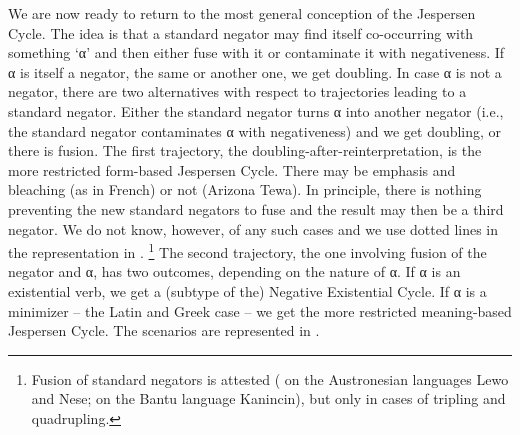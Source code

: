 ﻿\documentclass[output=paper,draft,draftmode,colorlinks,citecolor=brown]{langscibook}
\begin{document}
We are now ready to return to the most general conception of the Jespersen
Cycle. The idea is that a standard negator may find itself co-occurring
with something `α' and then either fuse with it or contaminate it with
negativeness. If α is itself a negator, the same or another one, we get
doubling. In case α is not a negator, there are two alternatives with
respect to trajectories leading to a standard negator. Either the standard
negator turns α into another negator (i.e., the standard negator
contaminates α with negativeness) and we get doubling, or there is fusion.
The first trajectory, the doubling-after-reinterpretation, is the more
restricted form-based Jespersen Cycle. There may be emphasis and bleaching
(as in French) or not (Arizona Tewa). In principle, there is nothing
preventing the new standard negators to fuse and the result may then be a
third negator. We do not know, however, of any such cases and we use dotted
lines in the representation in .%
%
\footnote{Fusion of standard
negators is attested (\citealt[18]{Vossen2016} on the Austronesian
languages Lewo and Nese; \citealt{DevosTshibanda2010} on the Bantu language
Kanincin), but only in cases of tripling and quadrupling.} %
%
The second trajectory, the one involving fusion of the negator and α, has
two outcomes, depending on the nature of α. If α is an existential verb, we
get a (subtype of the) Negative Existential Cycle. If α is a minimizer --
the Latin and Greek case -- we get the more restricted
meaning-based Jespersen Cycle. The scenarios are represented in
.
%
\end{document}
